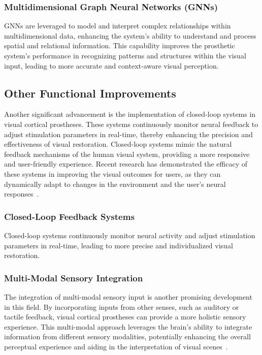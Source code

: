 \documentclass[twocolumn,10pt]{article}
\begin{document}
\subsubsection*{Multidimensional Graph Neural Networks (GNNs)}
GNNs are leveraged to model and interpret complex relationships within
multidimensional data, enhancing the system's ability to understand and process
spatial and relational information. This capability improves the prosthetic
system's performance in recognizing patterns and structures within the visual
input, leading to more accurate and context-aware visual perception.

\subsection{Other Functional Improvements}
Another significant advancement is the implementation of closed-loop systems in
visual cortical prostheses. These systems continuously monitor neural feedback
to adjust stimulation parameters in real-time, thereby enhancing the precision
and effectiveness of visual restoration. Closed-loop systems mimic the natural
feedback mechanisms of the human visual system, providing a more responsive and
user-friendly experience. Recent research has demonstrated the efficacy of these
systems in improving the visual outcomes for users, as they can dynamically
adapt to changes in the environment and the user's neural
responses~\cite{leviEditorialClosedLoopSystems2018}.

\subsubsection*{Closed-Loop Feedback Systems}
Closed-loop systems continuously monitor neural activity and adjust stimulation
parameters in real-time, leading to more precise and individualized visual
restoration.

\subsubsection*{Multi-Modal Sensory Integration}
The integration of multi-modal sensory input is another promising development in
this field. By incorporating inputs from other senses, such as auditory or
tactile feedback, visual cortical prostheses can provide a more holistic sensory
experience. This multi-modal approach leverages the brain's ability to integrate
information from different sensory modalities, potentially enhancing the overall
perceptual experience and aiding in the interpretation of visual
scenes~\cite{wanArtificialSensoryNeuron2020}.
\end{document}
